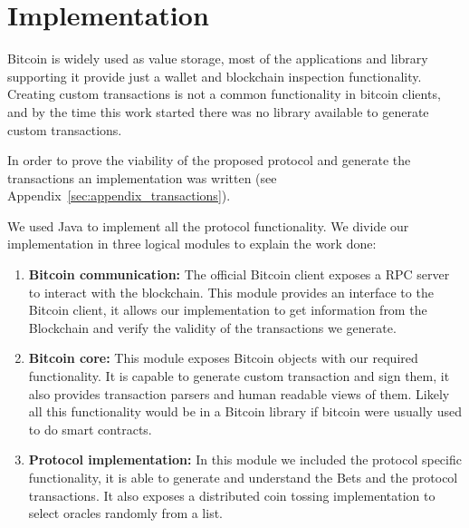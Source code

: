 \section{Implementation}

Bitcoin is widely used as value storage, most of the applications and library
  supporting it provide just a wallet and blockchain inspection functionality.
Creating custom transactions is not a common functionality in bitcoin clients,
  and by the time this work started there was no library available to generate
  custom transactions.

In order to prove the viability of the proposed protocol and generate the
  transactions an implementation
  was written (see Appendix~\ref{sec:appendix_transactions}).

We used Java to implement all the protocol functionality.
We divide our implementation in three logical modules to explain the work done:
\begin{enumerate}
\item \textbf{Bitcoin communication:}
The official Bitcoin client exposes a RPC server to interact with the
  blockchain.
This module provides an interface to the Bitcoin client, it allows our
  implementation to get information from the Blockchain and verify the
  validity of the transactions we generate.

\item \textbf{Bitcoin core:}
This module exposes Bitcoin objects with our required functionality.
It is capable to generate custom transaction and sign them, it also
  provides transaction parsers and human readable views of them.
Likely all this functionality would be in a Bitcoin library if bitcoin
  were usually used to do smart contracts.

\item \textbf{Protocol implementation:}
In this module we included the protocol specific functionality, it is able
  to generate and understand the Bets and the protocol transactions.
It also exposes a distributed coin tossing implementation to select oracles
  randomly from a list.
\end{enumerate}

